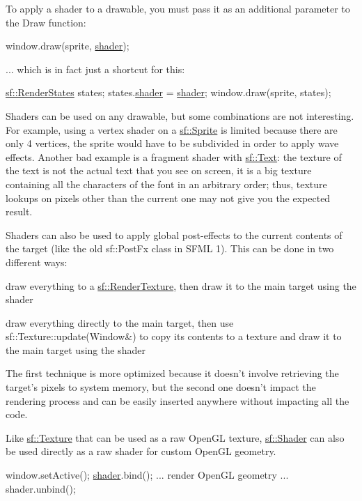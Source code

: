 To apply a shader to a drawable, you must pass it as an additional parameter to the Draw function\-: 
\begin{DoxyCode}
window.draw(sprite, \hyperlink{gl3_8h_a57b2a96adb1d51204909a82d861e395e}{shader});
\end{DoxyCode}


... which is in fact just a shortcut for this\-: 
\begin{DoxyCode}
\hyperlink{classsf_1_1_render_states}{sf::RenderStates} states;
states.\hyperlink{classsf_1_1_render_states_ad4f79ecdd0c60ed0d24fbe555b221bd8}{shader} = \hyperlink{gl3_8h_a57b2a96adb1d51204909a82d861e395e}{shader};
window.draw(sprite, states);
\end{DoxyCode}


Shaders can be used on any drawable, but some combinations are not interesting. For example, using a vertex shader on a \hyperlink{classsf_1_1_sprite}{sf\-::\-Sprite} is limited because there are only 4 vertices, the sprite would have to be subdivided in order to apply wave effects. Another bad example is a fragment shader with \hyperlink{classsf_1_1_text}{sf\-::\-Text}\-: the texture of the text is not the actual text that you see on screen, it is a big texture containing all the characters of the font in an arbitrary order; thus, texture lookups on pixels other than the current one may not give you the expected result.

Shaders can also be used to apply global post-\/effects to the current contents of the target (like the old sf\-::\-Post\-Fx class in S\-F\-M\-L 1). This can be done in two different ways\-: \begin{DoxyItemize}
\item draw everything to a \hyperlink{classsf_1_1_render_texture}{sf\-::\-Render\-Texture}, then draw it to the main target using the shader \item draw everything directly to the main target, then use sf\-::\-Texture\-::update(\-Window\&) to copy its contents to a texture and draw it to the main target using the shader\end{DoxyItemize}
The first technique is more optimized because it doesn't involve retrieving the target's pixels to system memory, but the second one doesn't impact the rendering process and can be easily inserted anywhere without impacting all the code.

Like \hyperlink{classsf_1_1_texture}{sf\-::\-Texture} that can be used as a raw Open\-G\-L texture, \hyperlink{classsf_1_1_shader}{sf\-::\-Shader} can also be used directly as a raw shader for custom Open\-G\-L geometry. 
\begin{DoxyCode}
window.setActive();
\hyperlink{gl3_8h_a57b2a96adb1d51204909a82d861e395e}{shader}.bind();
... render OpenGL geometry ...
shader.unbind();
\end{DoxyCode}
 

